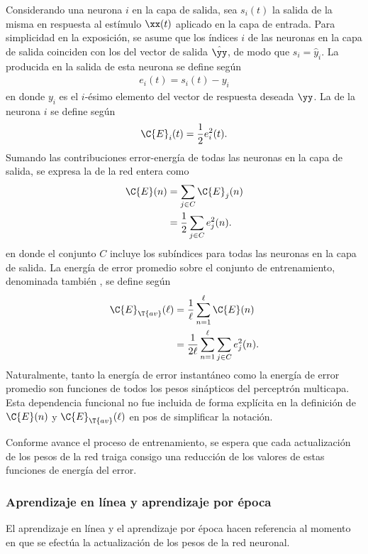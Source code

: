 Considerando una neurona $i$ en la capa de salida, sea $s_i(t)$ la
salida de la misma en respuesta al estímulo $\xx(t)$ aplicado en la
capa de entrada.  Para simplicidad en la exposición, se asume que los
índices $i$ de las neuronas en la capa de salida coinciden con los del
vector de salida $\hat{\yy}$, de modo que $s_i=\hat{y}_i$.  La
 producida en la salida de esta neurona se define
según
%
\begin{align}\label{e2:error-signal-neuron} %
  e_i(t)=s_{i}(t)-y_{i}
\end{align}
%
en donde $y_{i}$ es el $i$-ésimo elemento del vector de respuesta
deseada $\yy$. La  de la neurona
$i$ se define según
%
\begin{align}\label{e2:error-energy-neuron} %
  \C{E}_i(t)=\frac{1}{2}e^2_i(t).
\end{align}
%
Sumando las contribuciones error-energía de todas las neuronas en la
capa de salida, se expresa la 
de la red entera como
%
\begin{align}\label{e2:error-energy-net} %
  \C{E}(n)&=\sum_{j\in C}\C{E}_j(n) \\
  &=\frac{1}{2}\sum_{j\in C}e^2_j(n).
\end{align}
%
en donde el conjunto $C$ incluye los subíndices para todas las
neuronas en la capa de salida. La energía de error promedio sobre el
conjunto de entrenamiento, denominada también , se
define según
%
\begin{align}\label{e2:average-energy-net} %
  \C{E}_{\T{av}}(\ell)&=\frac{1}{\ell}\sum_{n=1}^\ell\C{E}(n) \\
  &=\frac{1}{2\ell} \sum_{n=1}^\ell \sum_{j\in C}e^2_j(n).
\end{align}
%
Naturalmente, tanto la energía de error instantáneo como la energía de
error promedio son funciones de todos los pesos sinápticos del
perceptrón multicapa. Esta dependencia funcional no fue incluida de
forma explícita en la definición de $\C{E}(n)$ y
$\C{E}_{\T{av}}(\ell)$ en pos de simplificar la notación.

Conforme avance el proceso de entrenamiento, se espera que cada
actualización de los pesos de la red traiga consigo una reducción de
los valores de estas funciones de energía del error.
%
\subsubsection{Aprendizaje en línea y aprendizaje por época}
%
El aprendizaje en línea y el aprendizaje por época hacen referencia
al momento en que se efectúa la actualización de los pesos de la
red neuronal.


